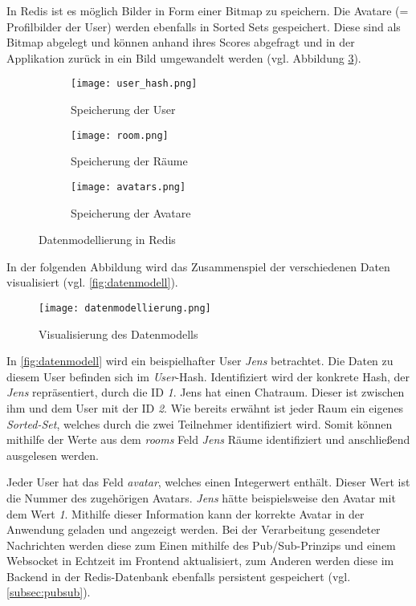 In \acs{Redis} ist es möglich Bilder in Form einer Bitmap zu speichern. Die Avatare (= Profilbilder der User) werden ebenfalls in Sorted Sets gespeichert. Diese sind als Bitmap abgelegt und können anhand ihres Scores abgefragt und in der Applikation zurück in ein Bild umgewandelt werden (vgl. Abbildung \ref{fig:sub3}).
\begin{figure}[h]
	\centering
	
	\begin{subfigure}{0.3\textwidth}
		\centering
		\texttt{[image: user\_hash.png]}
		\caption{Speicherung der User}
		\label{fig:sub1}
	\end{subfigure}%
	\hspace{0.02\textwidth}
	\begin{subfigure}{0.3\textwidth}
		\centering
		\texttt{[image: room.png]}
		\caption{Speicherung der Räume}
		\label{fig:sub2}
	\end{subfigure}%
	\hspace{0.02\textwidth}
	\begin{subfigure}{0.3\textwidth}
		\centering
		\texttt{[image: avatars.png]}
		\caption{Speicherung der Avatare}
		\label{fig:sub3}
	\end{subfigure}
	
	\caption{Datenmodellierung in \acs{Redis}}
	\label{fig:overall}
\end{figure}
\newpage
In der folgenden Abbildung wird das Zusammenspiel der verschiedenen Daten visualisiert (vgl.  \autoref{fig:datenmodell}). 
\begin{figure}[h]
	\centering
	\texttt{[image: datenmodellierung.png]}
	\caption{Visualisierung des Datenmodells}
	\label{fig:datenmodell}
\end{figure}

In \autoref{fig:datenmodell} wird ein beispielhafter User \textit{Jens} betrachtet. Die Daten zu diesem User befinden sich im \textit{User}-Hash. Identifiziert wird der konkrete Hash, der \textit{Jens} repräsentiert, durch die ID \textit{1}. Jens hat einen Chatraum. Dieser ist zwischen ihm und dem User mit der ID \textit{2}. Wie bereits erwähnt ist jeder Raum ein eigenes \textit{Sorted-Set}, welches durch die zwei Teilnehmer identifiziert wird. Somit können mithilfe der Werte aus dem \textit{rooms} Feld \textit{Jens} Räume identifiziert und anschließend ausgelesen werden.

Jeder User hat das Feld \textit{avatar}, welches einen Integerwert enthält. Dieser Wert ist die Nummer des zugehörigen Avatars. \textit{Jens} hätte beispielsweise den Avatar mit dem Wert \textit{1}. Mithilfe dieser Information kann der korrekte Avatar in der Anwendung geladen und angezeigt werden.
\newpage
Bei der Verarbeitung gesendeter Nachrichten werden diese zum Einen mithilfe des \acs{Pub/Sub}-Prinzips und einem Websocket in Echtzeit im Frontend aktualisiert, zum Anderen werden diese im Backend in der \acs{Redis}-Datenbank ebenfalls persistent gespeichert (vgl. \autoref{subsec:pubsub}). 

